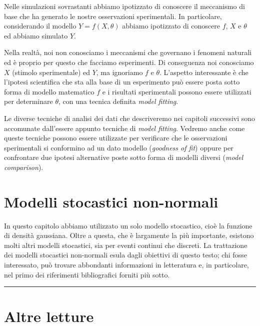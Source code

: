 \documentclass[a4paper,12pt,oneside]{book}
\begin{document}
Nelle simulazioni sovrastanti abbiamo ipotizzato di conoscere il meccanismo di base che ha generato le nostre osservazioni sperimentali. In particolare, considerando il modello \(Y = f(X, \theta)\) abbiamo ipotizzato di conoscere \(f\), \(X\) e \(\theta\) ed abbiamo simulato \(Y\).

Nella realtà, noi non conosciamo i meccanismi che governano i fenomeni naturali ed è proprio per questo che facciamo esperimenti. Di conseguenza noi conosciamo \(X\) (stimolo sperimentale) ed \(Y\), ma ignoriamo \(f\) e \(\theta\). L'aspetto interessante è che l'ipotesi scientifica che sta alla base di un esperimento può essere posta sotto forma di modello matematico \(f\) e i risultati sperimentali possono essere utilizzati per determinare \(\theta\), con una tecnica definita \emph{model fitting}.

Le diverse tecniche di analisi dei dati che descriveremo nei capitoli successivi sono accomunate dall'essere appunto tecniche di \emph{model fitting}. Vedremo anche come queste tecniche possono essere utilizzate per verificare che le osservazioni sperimentali si conformino ad un dato modello (\emph{goodness of fit}) oppure per confrontare due ipotesi alternative poste sotto forma di modelli diversi (\emph{model comparison}).

\hypertarget{modelli-stocastici-non-normali}{%
\section{Modelli stocastici non-normali}\label{modelli-stocastici-non-normali}}

In questo capitolo abbiamo utilizzato un solo modello stocastico, cioè la funzione di densità gaussiana. Oltre a questa, che è largamente la più importante, esistono molti altri modelli stocastici, sia per eventi continui che discreti. La trattazione dei modelli stocastici non-normali esula dagli obiettivi di questo testo; chi fosse interessato, può trovare abbondanti informazioni in letteratura e, in particolare, nel primo dei riferimenti bibliografici forniti più sotto.

\begin{center}\rule{0.5\linewidth}{0.5pt}\end{center}

\hypertarget{altre-letture-3}{%
\section{Altre letture}\label{altre-letture-3}}
\end{document}
